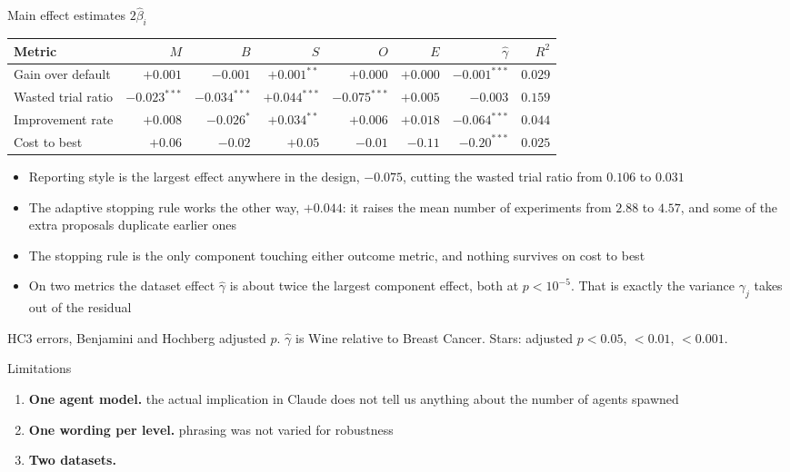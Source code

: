 \documentclass[aspectratio=169,11pt]{beamer}
\newcommand{\fnote}[1]{{\scriptsize\color{muted}#1}}
\begin{document}
\begin{frame}{Main effect estimates $2\hat\beta_i$}
  \scriptsize
  \begin{center}
  \begin{tabular}{@{}lrrrrrrr@{}}
    \toprule
    Metric & $M$ & $B$ & $S$ & $O$ & $E$ & $\hat\gamma$ & $R^2$\\
    \midrule
    Gain over default   & $+0.001$ & $-0.001$ & $+0.001^{**}$ & $+0.000$ & $+0.000$ & $-0.001^{***}$ & $0.029$\\
    Wasted trial ratio  & $-0.023^{***}$ & $-0.034^{***}$ & $+0.044^{***}$ & $-0.075^{***}$ & $+0.005$ & $-0.003$ & $0.159$\\
    Improvement rate    & $+0.008$ & $-0.026^{*}$ & $+0.034^{**}$ & $+0.006$ & $+0.018$ & $-0.064^{***}$ & $0.044$\\
    Cost to best        & $+0.06$ & $-0.02$ & $+0.05$ & $-0.01$ & $-0.11$ & $-0.20^{***}$ & $0.025$\\
    \bottomrule
  \end{tabular}
  \end{center}
  \vspace{0.2cm}
  \small
  \begin{itemize}
    \item Reporting style is the largest effect anywhere in the design,
          $-0.075$, cutting the wasted trial ratio from $0.106$ to $0.031$
    \item The adaptive stopping rule works the other way, $+0.044$: it raises
          the mean number of experiments from $2.88$ to $4.57$, and some of the
          extra proposals duplicate earlier ones
    \item The stopping rule is the only component touching either outcome
          metric, and nothing survives on cost to best
    \item On two metrics the dataset effect $\hat\gamma$ is about twice the
          largest component effect, both at $p<10^{-5}$. That is exactly the
          variance $\gamma_j$ takes out of the residual
  \end{itemize}
  \vfill
  \fnote{HC3 errors, Benjamini and Hochberg adjusted $p$. $\hat\gamma$ is Wine
        relative to Breast Cancer. Stars: adjusted $p<0.05$, $<0.01$, $<0.001$.}
\end{frame}


\begin{frame}{Limitations}
  \begin{enumerate}
    \item \textbf{One agent model.} 
    the actual implication in Claude does not tell us anything about the number of agents spawned
    \item \textbf{One wording per level.} phrasing
          was not varied for robustness
    \item \textbf{Two datasets.}
  \end{enumerate}
  \vfill
\end{frame}
\end{document}
